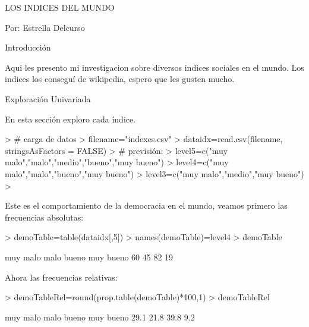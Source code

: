 \documentclass{article}
\begin{document}


LOS INDICES DEL MUNDO


Por: Estrella Delcurso


Introducción

Aqui les presento mi investigacion sobre diversos indices sociales en el mundo. Los indices los conseguí de wikipedia, espero que les gusten mucho.


Exploración Univariada

En esta sección exploro cada índice.


\begin{Schunk}
\begin{Sinput}
> # carga de datos
> filename="indexes.csv"
> dataidx=read.csv(filename, stringsAsFactors = FALSE)
> # previsión:
> level5=c("muy malo","malo","medio","bueno","muy bueno")
> level4=c("muy malo","malo","bueno","muy bueno")
> level3=c("muy malo","medio","muy bueno")
> 
\end{Sinput}
\end{Schunk}


Este es el comportamiento de la democracia en el mundo, veamos primero las frecuencias absolutas:
\begin{Schunk}
\begin{Sinput}
> demoTable=table(dataidx[,5])
> names(demoTable)=level4
> demoTable
\end{Sinput}
\begin{Soutput}
 muy malo      malo     bueno muy bueno 
       60        45        82        19 
\end{Soutput}
\end{Schunk}

Ahora las frecuencias relativas:
\begin{Schunk}
\begin{Sinput}
> demoTableRel=round(prop.table(demoTable)*100,1)
> demoTableRel
\end{Sinput}
\begin{Soutput}
 muy malo      malo     bueno muy bueno 
     29.1      21.8      39.8       9.2 
\end{Soutput}
\end{Schunk}
\end{document}
